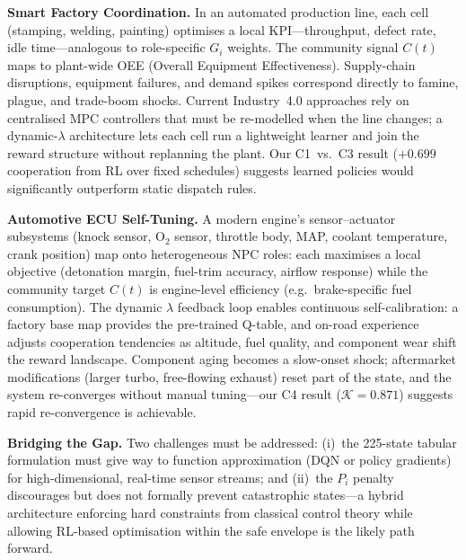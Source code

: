 \documentclass[12pt, a4paper, oneside]{report}
\begin{document}
\textbf{Smart Factory Coordination.}
In an automated production line, each cell (stamping, welding, painting) optimises a local KPI---throughput, defect rate, idle time---analogous to role-specific $G_i$ weights. The community signal $C(t)$ maps to plant-wide OEE (Overall Equipment Effectiveness). Supply-chain disruptions, equipment failures, and demand spikes correspond directly to famine, plague, and trade-boom shocks. Current Industry~4.0 approaches rely on centralised MPC controllers that must be re-modelled when the line changes; a dynamic-$\lambda$ architecture lets each cell run a lightweight learner and join the reward structure without replanning the plant. Our C1~vs.~C3 result ($+0.699$ cooperation from RL over fixed schedules) suggests learned policies would significantly outperform static dispatch rules.

\textbf{Automotive ECU Self-Tuning.}
A modern engine's sensor--actuator subsystems (knock sensor, O$_2$ sensor, throttle body, MAP, coolant temperature, crank position) map onto heterogeneous NPC roles: each maximises a local objective (detonation margin, fuel-trim accuracy, airflow response) while the community target $C(t)$ is engine-level efficiency (e.g.\ brake-specific fuel consumption). The dynamic $\lambda$ feedback loop enables continuous self-calibration: a factory base map provides the pre-trained Q-table, and on-road experience adjusts cooperation tendencies as altitude, fuel quality, and component wear shift the reward landscape. Component aging becomes a slow-onset shock; aftermarket modifications (larger turbo, free-flowing exhaust) reset part of the state, and the system re-converges without manual tuning---our C4 result ($\mathcal{K} = 0.871$) suggests rapid re-convergence is achievable.

\textbf{Bridging the Gap.}
Two challenges must be addressed: (i)~the 225-state tabular formulation must give way to function approximation (DQN or policy gradients) for high-dimensional, real-time sensor streams; and (ii)~the $P_i$ penalty discourages but does not formally prevent catastrophic states---a hybrid architecture enforcing hard constraints from classical control theory while allowing RL-based optimisation within the safe envelope is the likely path forward.



\end{document}
